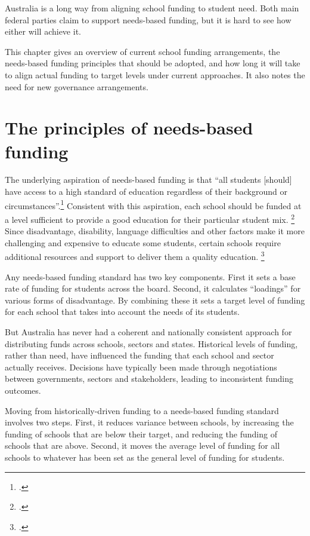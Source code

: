 \documentclass{grattan}
\begin{document}
Australia is a long way from aligning school funding to student need.
Both main federal parties claim to support needs-based funding, but it is hard to see how either will achieve it.

This chapter gives an overview of current school funding arrangements, the needs-based funding principles that should be adopted, and how long it will take to align actual funding to target levels under current approaches. It also notes the need for new governance arrangements.

\section{The principles of needs-based funding}\label{sec:the-principles-of-needs-based-funding}

The underlying aspiration of needs-based funding is that ``all students [should] have access to a high standard of education regardless of their background or circumstances''.\footcite[][xxxi]{Gonski2011ReviewFundingSchooling}
Consistent with this aspiration, each school should be funded at a level sufficient to provide a good education for their particular student mix.%
\footcite[][xxi]{Gonski2011ReviewFundingSchooling}
Since disadvantage, disability, language difficulties and other factors make it more challenging and expensive to educate some students, certain schools require additional resources and support to deliver them a quality education.
\footcite[][xxi]{Gonski2011ReviewFundingSchooling}

Any needs-based funding standard has two key components. First it sets a base rate of funding for students across the board.  Second, it calculates ``loadings'' for various forms of disadvantage. By combining these it sets a target level of funding for each school that takes into account the needs of its students.

But Australia has never had a coherent and nationally consistent approach for distributing funds across schools, sectors and states.
Historical levels of funding, rather than need, have influenced the funding that each school and sector actually receives. Decisions have typically been made through negotiations between governments, sectors and stakeholders, leading to inconsistent funding outcomes.

Moving from historically-driven funding to a needs-based funding standard involves two steps.
First, it reduces variance between schools, by increasing the funding of schools that are below their target, and reducing the funding of schools that are above.
Second, it moves the average level of funding for all schools to whatever has been set as the general level of funding for students.
\end{document}
